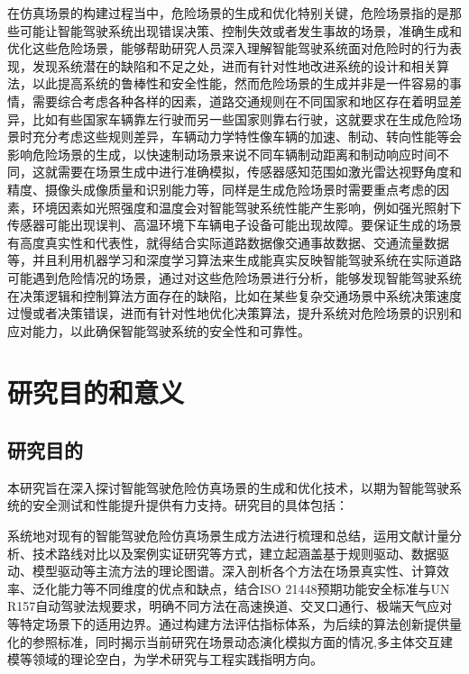 在仿真场景的构建过程当中，危险场景的生成和优化特别关键，危险场景指的是那些可能让智能驾驶系统出现错误决策、控制失效或者发生事故的场景，准确生成和优化这些危险场景，能够帮助研究人员深入理解智能驾驶系统面对危险时的行为表现，发现系统潜在的缺陷和不足之处，进而有针对性地改进系统的设计和相关算法，以此提高系统的鲁棒性和安全性能，然而危险场景的生成并非是一件容易的事情，需要综合考虑各种各样的因素，道路交通规则在不同国家和地区存在着明显差异，比如有些国家车辆靠左行驶而另一些国家则靠右行驶，这就要求在生成危险场景时充分考虑这些规则差异，车辆动力学特性像车辆的加速、制动、转向性能等会影响危险场景的生成，以快速制动场景来说不同车辆制动距离和制动响应时间不同，这就需要在场景生成中进行准确模拟，传感器感知范围如激光雷达视野角度和精度、摄像头成像质量和识别能力等，同样是生成危险场景时需要重点考虑的因素，环境因素如光照强度和温度会对智能驾驶系统性能产生影响，例如强光照射下传感器可能出现误判、高温环境下车辆电子设备可能出现故障。要保证生成的场景有高度真实性和代表性，就得结合实际道路数据像交通事故数据、交通流量数据等\cite{benmimoun2011incident}，并且利用机器学习和深度学习算法来生成能真实反映智能驾驶系统在实际道路可能遇到危险情况的场景，通过对这些危险场景进行分析，能够发现智能驾驶系统在决策逻辑和控制算法方面存在的缺陷，比如在某些复杂交通场景中系统决策速度过慢或者决策错误，进而有针对性地优化决策算法，提升系统对危险场景的识别和应对能力，以此确保智能驾驶系统的安全性和可靠性。



\section{研究目的和意义}

\subsection{研究目的}
本研究旨在深入探讨智能驾驶危险仿真场景的生成和优化技术，以期为智能驾驶系统的安全测试和性能提升提供有力支持。研究目的具体包括：

系统地对现有的智能驾驶危险仿真场景生成方法进行梳理和总结，运用文献计量分析、技术路线对比以及案例实证研究等方式，建立起涵盖基于规则驱动、数据驱动、模型驱动等主流方法的理论图谱。深入剖析各个方法在场景真实性、计算效率、泛化能力等不同维度的优点和缺点，结合ISO 21448预期功能安全标准与UN R157自动驾驶法规要求，明确不同方法在高速换道、交叉口通行、极端天气应对等特定场景下的适用边界。通过构建方法评估指标体系，为后续的算法创新提供量化的参照标准\cite{najm2007pre}，同时揭示当前研究在场景动态演化模拟方面的情况,多主体交互建模等领域的理论空白，为学术研究与工程实践指明方向。​

